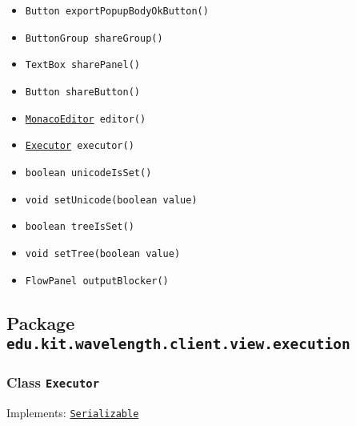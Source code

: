 \begin{itemize}
\item \texttt{Button exportPopupBodyOkButton()}



\item \texttt{ButtonGroup shareGroup()}



\item \texttt{TextBox sharePanel()}



\item \texttt{Button shareButton()}



\item \texttt{\hyperref[type:edu.kit.wavelength.client.view.gwt.MonacoEditor]{MonacoEditor} editor()}



\item \texttt{\hyperref[type:edu.kit.wavelength.client.view.execution.Executor]{Executor} executor()}



\item \texttt{boolean unicodeIsSet()}



\item \texttt{void setUnicode(boolean value)}



\item \texttt{boolean treeIsSet()}



\item \texttt{void setTree(boolean value)}



\item \texttt{FlowPanel outputBlocker()}



\end{itemize}

\subsection{Package \lstinline{edu.kit.wavelength.client.view.execution}}
\label{pkg:edu.kit.wavelength.client.view.execution}


\subsubsection{Class \texttt{Executor}}
\label{type:edu.kit.wavelength.client.view.execution.Executor}
Implements: \texttt{\hyperref[type:edu.kit.wavelength.client.model.serialization.Serializable]{Serializable}}

